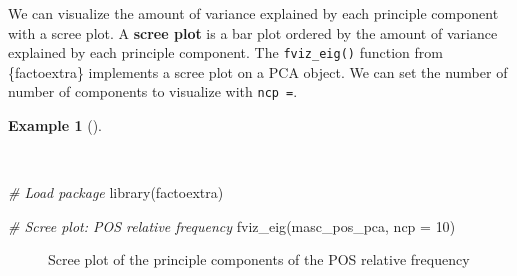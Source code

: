 \documentclass[
  letterpaper,
]{book}
\newenvironment{Shaded}{\begin{snugshade}}{\end{snugshade}}
\newcommand{\AttributeTok}[1]{\textcolor[rgb]{0.00,0.00,0.00}{#1}}
\newcommand{\CommentTok}[1]{\textcolor[rgb]{0.00,0.00,0.00}{\textit{#1}}}
\newcommand{\DecValTok}[1]{\textcolor[rgb]{0.00,0.00,0.00}{#1}}
\newcommand{\FunctionTok}[1]{\textcolor[rgb]{0.00,0.00,0.00}{#1}}
\newcommand{\NormalTok}[1]{\textcolor[rgb]{0.00,0.00,0.00}{#1}}
\theoremstyle{definition}
\newtheorem{example}{Example}[chapter]
\theoremstyle{remark}
\begin{document}
We can visualize the amount of variance explained by each principle
component with a scree plot. A \textbf{scree plot} is a bar plot ordered
by the amount of variance explained by each principle component. The
\texttt{fviz\_eig()} function from \{factoextra\} implements a scree
plot on a PCA object. We can set the number of number of components to
visualize with \texttt{ncp\ =}.

\begin{example}[]\protect\hypertarget{exm-explore-masc-dtms-pca-scree}{}\label{exm-explore-masc-dtms-pca-scree}

~

\begin{Shaded}
\begin{Highlighting}[]
\CommentTok{\# Load package}
\FunctionTok{library}\NormalTok{(factoextra)}

\CommentTok{\# Scree plot: POS relative frequency}
\FunctionTok{fviz\_eig}\NormalTok{(masc\_pos\_pca, }\AttributeTok{ncp =} \DecValTok{10}\NormalTok{)}
\end{Highlighting}
\end{Shaded}

\begin{figure}[!htb]


\caption{\label{fig-explore-masc-dtms-pca-scree}Scree plot of the
principle components of the POS relative frequency}

\end{figure}%

\end{example}
\end{document}
